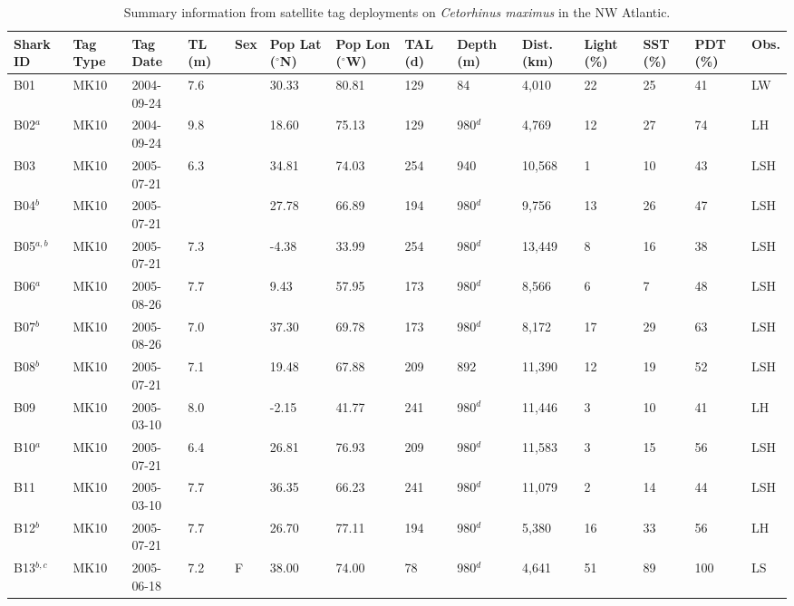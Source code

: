 \begin{table}[t!]
\caption{Summary information from satellite tag deployments on \textit{Cetorhinus maximus} in the NW Atlantic.}
\label{tab:c3t1}
\centering
\scriptsize
\begin{tabular}{p{.75cm} p{.85cm} p{1.5cm} p{.5cm} p{.5cm} p{.75cm} p{.75cm} p{.5cm} p{.75cm} p{.75cm} p{.5cm} p{.5cm} p{.5cm} p{.5cm}}
\toprule
\textbf{Shark ID} & \textbf{Tag Type} & \textbf{Tag Date} & \textbf{TL (m)} & \textbf{Sex} & \textbf{Pop Lat ($^{\circ}$N)} & \textbf{Pop Lon ($^{\circ}$W)} & \textbf{TAL (d)} & \textbf{Depth (m)} & \textbf{Dist. (km)} & \textbf{Light (\%)} & \textbf{SST (\%)} & \textbf{PDT (\%)} & \textbf{Obs.}\\
\midrule
B01 & MK10 & 2004-09-24 & 7.6 &  & 30.33 & 80.81 & 129 & 84 & 4,010 & 22 & 25 & 41 & LW\\
B02$^a$ & MK10 & 2004-09-24 & 9.8 &  & 18.60 & 75.13 & 129 & 980$^d$ & 4,769 & 12 & 27 & 74 & LH\\
B03 & MK10 & 2005-07-21 & 6.3 &  & 34.81 & 74.03 & 254 & 940 & 10,568 & 1 & 10 & 43 & LSH\\
B04$^b$ & MK10 & 2005-07-21 &  &  & 27.78 & 66.89 & 194 & 980$^d$ & 9,756 & 13 & 26 & 47 & LSH\\
B05$^{a,b}$ & MK10 & 2005-07-21 & 7.3 &  & -4.38 & 33.99 & 254 & 980$^d$ & 13,449 & 8 & 16 & 38 & LSH\\
B06$^a$ & MK10 & 2005-08-26 & 7.7 &  & 9.43 & 57.95 & 173 & 980$^d$ & 8,566 & 6 & 7 & 48 & LSH\\
B07$^b$ & MK10 & 2005-08-26 & 7.0 &  & 37.30 & 69.78 & 173 & 980$^d$ & 8,172 & 17 & 29 & 63 & LSH\\
B08$^b$ & MK10 & 2005-07-21 & 7.1 &  & 19.48 & 67.88 & 209 & 892 & 11,390 & 12 & 19 & 52 & LSH\\
B09 & MK10 & 2005-03-10 & 8.0 &  & -2.15 & 41.77 & 241 & 980$^d$ & 11,446 & 3 & 10 & 41 & LH\\
B10$^a$ & MK10 & 2005-07-21 & 6.4 &  & 26.81 & 76.93 & 209 & 980$^d$ & 11,583 & 3 & 15 & 56 & LSH\\
B11 & MK10 & 2005-03-10 & 7.7 &  & 36.35 & 66.23 & 241 & 980$^d$ & 11,079 & 2 & 14 & 44 & LSH\\
B12$^b$ & MK10 & 2005-07-21 & 7.7 &  & 26.70 & 77.11 & 194 & 980$^d$ & 5,380 & 16 & 33 & 56 & LH\\
B13$^{b,c}$ & MK10 & 2005-06-18 & 7.2 & F & 38.00 & 74.00 & 78 & 980$^d$ & 4,641 & 51 & 89 & 100 & LS\\

\end{tabular}
\end{table}
